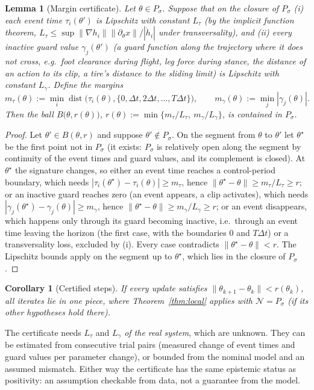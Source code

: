 \documentclass[11pt]{article}
\newtheorem{lemma}[theorem]{Lemma}
\newtheorem{corollary}[theorem]{Corollary}
\theoremstyle{definition}
\theoremstyle{remark}
\newcommand{\cN}{\mathcal{N}}
\newcommand{\n}[1]{\lVert #1\rVert}
\begin{document}
\begin{lemma}[Margin certificate]\label{lem:margin}
Let $\theta\in P_\sigma$. Suppose that on the closure of $P_\sigma$ (i) each event time $\tau_i(\theta')$ is Lipschitz with
constant $L_\tau$ (by the implicit function theorem, $L_\tau\le\sup\n{\nabla h_i}\n{\partial_\theta x}/|\dot h_i|$
under transversality), and (ii) every \emph{inactive} guard value $\gamma_j(\theta')$ (a guard function along the
trajectory where it does not cross, e.g.\ foot clearance during flight, leg force during stance, the distance of an
action to its clip, a tire's distance to the sliding limit) is Lipschitz with constant $L_\gamma$. Define the margins
\[m_\tau(\theta):=\min_i\operatorname{dist}\big(\tau_i(\theta),\{0,\Delta t,2\Delta t,\dots,T\Delta t\}\big),\qquad
m_\gamma(\theta):=\min_j|\gamma_j(\theta)|.\]
Then the ball $B\big(\theta,r(\theta)\big)$, $r(\theta):=\min\{m_\tau/L_\tau,\ m_\gamma/L_\gamma\}$, is contained in
$P_\sigma$.
\end{lemma}
\begin{proof}
Let $\theta'\in B(\theta,r)$ and suppose $\theta'\notin P_\sigma$. On the segment from $\theta$ to $\theta'$ let
$\theta^\star$ be the first point not in $P_\sigma$ (it exists: $P_\sigma$ is relatively open along the segment by
continuity of the event times and guard values, and its complement is closed). At $\theta^\star$ the signature changes,
so either an event time reaches a control-period boundary, which needs $|\tau_i(\theta^\star)-\tau_i(\theta)|\ge
m_\tau$, hence $\n{\theta^\star-\theta}\ge m_\tau/L_\tau\ge r$; or an inactive guard reaches zero (an event appears,
a clip activates), which needs $|\gamma_j(\theta^\star)-\gamma_j(\theta)|\ge m_\gamma$, hence $\n{\theta^\star-\theta}\ge
m_\gamma/L_\gamma\ge r$; or an event disappears, which happens only through its guard becoming inactive, i.e.\ through
an event time leaving the horizon (the first case, with the boundaries $0$ and $T\Delta t$) or a transversality loss,
excluded by (i). Every case contradicts $\n{\theta^\star-\theta}<r$. The Lipschitz bounds apply on the segment up to
$\theta^\star$, which lies in the closure of $P_\sigma$.
\end{proof}

\begin{corollary}[Certified steps]\label{cor:certified}
If every update satisfies $\n{\theta_{k+1}-\theta_k}<r(\theta_k)$, all iterates lie in one piece, where
Theorem~\ref{thm:local} applies with $\cN=P_\sigma$ (if its other hypotheses hold there).
\end{corollary}
The certificate needs $L_\tau$ and $L_\gamma$ \emph{of the real system}, which are unknown. They can be estimated from
consecutive trial pairs (measured change of event times and guard values per parameter change), or bounded from the
nominal model and an assumed mismatch. Either way the certificate has the same epistemic status as positivity: an
assumption checkable from data, not a guarantee from the model.
\end{document}
